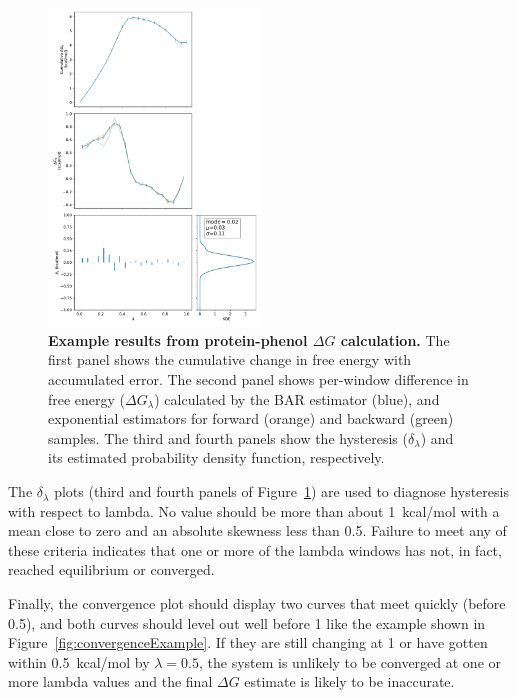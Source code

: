 \documentclass[9pt,tutorial]{Styling/livecoms}
\begin{document}
\begin{figure}[!ht]
    \centering
    \includegraphics[width=0.5\textwidth]{"bound_generalFigures"}
    \caption{\textbf{Example results from protein-phenol $\Delta G$ calculation.} The first panel shows the cumulative change in free energy with accumulated error. The second panel shows per-window difference in free energy ($\Delta G_\lambda$) calculated by the BAR estimator (blue), and exponential estimators for forward (orange) and backward (green) samples. The third and fourth panels show the hysteresis ($\delta_\lambda$) and its estimated probability density function, respectively.
    }\label{fig:FEPexample}
\end{figure}

The $\delta_\lambda$ plots (third and fourth panels of Figure~\ref{fig:FEPexample}) are used to diagnose hysteresis with respect to lambda. No value should be more than about 1~kcal/mol with a mean close to zero and an absolute skewness less than 0.5. Failure to meet any of these criteria indicates that one or more of the lambda windows has not, in fact, reached equilibrium or converged.

Finally, the convergence plot should display two curves that meet quickly (before 0.5), and both curves should level out well before 1 like the example shown in Figure~\ref{fig:convergenceExample}. If they are still changing at 1 or have gotten within 0.5~kcal/mol by $\lambda=0.5$, the system is unlikely to be converged at one or more lambda values and the final $\Delta G$ estimate is likely to be inaccurate.
\end{document}
